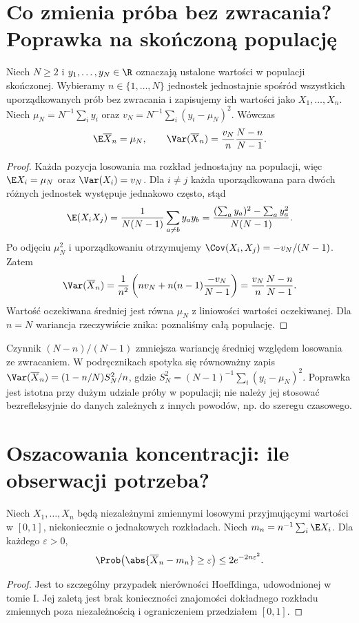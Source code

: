 \section{Co zmienia próba bez zwracania? Poprawka na skończoną populację}\label{sec:fpc}
\begin{twierdzenie}\label{thm:fpc}
Niech $N\ge2$ i $y_1,\ldots,y_N\in\R$ oznaczają ustalone wartości w populacji skończonej. Wybieramy $n\in\{1,\ldots,N\}$ jednostek jednostajnie spośród wszystkich uporządkowanych prób bez zwracania i zapisujemy ich wartości jako $X_1,\ldots,X_n$. Niech $\mu_N=N^{-1}\sum_i y_i$ oraz $v_N=N^{-1}\sum_i(y_i-\mu_N)^2$. Wówczas
\[
\E\overline X_n=\mu_N,\qquad
\Var(\overline X_n)=\frac{v_N}{n}\frac{N-n}{N-1}.
\]
\end{twierdzenie}
\begin{proof}
Każda pozycja losowania ma rozkład jednostajny na populacji, więc $\E X_i=\mu_N$ oraz $\Var(X_i)=v_N$. Dla $i\ne j$ każda uporządkowana para dwóch różnych jednostek występuje jednakowo często, stąd
\[
\E(X_iX_j)=\frac1{N(N-1)}\sum_{a\ne b}y_ay_b
=\frac{(\sum_a y_a)^2-\sum_a y_a^2}{N(N-1)}.
\]
Po odjęciu $\mu_N^2$ i uporządkowaniu otrzymujemy $\Cov(X_i,X_j)=-v_N/(N-1)$. Zatem
\[
\Var(\overline X_n)=\frac1{n^2}\left(nv_N+n(n-1)\frac{-v_N}{N-1}\right)
=\frac{v_N}{n}\frac{N-n}{N-1}.
\]
Wartość oczekiwana średniej jest równa $\mu_N$ z liniowości wartości oczekiwanej. Dla $n=N$ wariancja rzeczywiście znika: poznaliśmy całą populację.
\end{proof}

\begin{uwaga}
Czynnik $(N-n)/(N-1)$ zmniejsza wariancję średniej względem losowania ze zwracaniem. W podręcznikach spotyka się równoważny zapis $\Var(\overline X_n)=(1-n/N)S_N^2/n$, gdzie $S_N^2=(N-1)^{-1}\sum_i(y_i-\mu_N)^2$. Poprawka jest istotna przy dużym udziale próby w populacji; nie należy jej stosować bezrefleksyjnie do danych zależnych z innych powodów, np. do szeregu czasowego.
\end{uwaga}

\section{Oszacowania koncentracji: ile obserwacji potrzeba?}
\begin{twierdzenie}\label{thm:hoeffding-demo}
Niech $X_1,\ldots,X_n$ będą niezależnymi zmiennymi losowymi przyjmującymi wartości w $[0,1]$, niekoniecznie o jednakowych rozkładach. Niech $m_n=n^{-1}\sum_i\E X_i$. Dla każdego $\varepsilon>0$,
\[
\Prob\!\left(\abs{\overline X_n-m_n}\ge\varepsilon\right)
\le 2e^{-2n\varepsilon^2}.
\]
\end{twierdzenie}
\begin{proof}
Jest to szczególny przypadek nierówności Hoeffdinga, udowodnionej w tomie I. Jej zaletą jest brak konieczności znajomości dokładnego rozkładu zmiennych poza niezależnością i ograniczeniem przedziałem $[0,1]$.
\end{proof}

